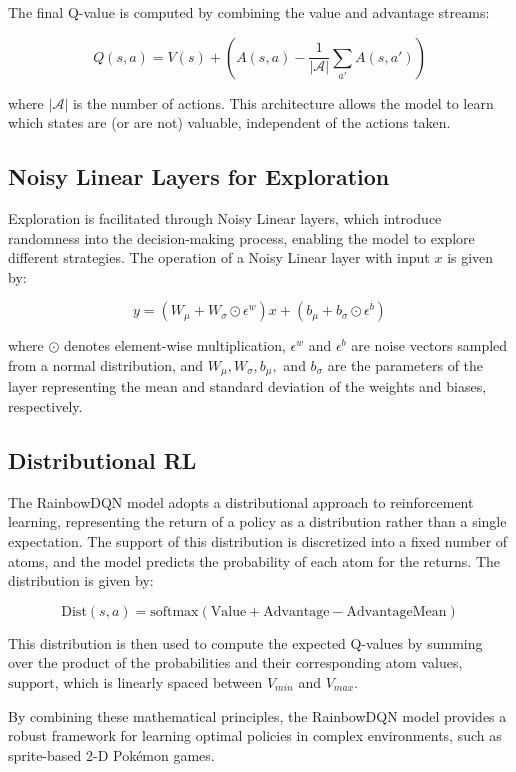 \documentclass[12pt,a4paper]{article}
\begin{document}
The final Q-value is computed by combining the value and advantage streams:

\[
Q(s, a) = V(s) + (A(s, a) - \frac{1}{|\mathcal{A}|} \sum_{a'} A(s, a'))
\]

where $|\mathcal{A}|$ is the number of actions. This architecture allows the model to learn which states are (or are not) valuable, independent of the actions taken.

\subsection{Noisy Linear Layers for Exploration}

Exploration is facilitated through Noisy Linear layers, which introduce randomness into the decision-making process, enabling the model to explore different strategies. The operation of a Noisy Linear layer with input $x$ is given by:

\[
y = (W_{\mu} + W_{\sigma} \odot \epsilon^w) x + (b_{\mu} + b_{\sigma} \odot \epsilon^b)
\]

where $\odot$ denotes element-wise multiplication, $\epsilon^w$ and $\epsilon^b$ are noise vectors sampled from a normal distribution, and $W_{\mu}, W_{\sigma}, b_{\mu},$ and $b_{\sigma}$ are the parameters of the layer representing the mean and standard deviation of the weights and biases, respectively.

\subsection{Distributional RL}

The RainbowDQN model adopts a distributional approach to reinforcement learning, representing the return of a policy as a distribution rather than a single expectation. The support of this distribution is discretized into a fixed number of atoms, and the model predicts the probability of each atom for the returns. The distribution is given by:

\[
\text{Dist}(s, a) = \text{softmax}(\text{Value} + \text{Advantage} - \text{AdvantageMean})
\]

This distribution is then used to compute the expected Q-values by summing over the product of the probabilities and their corresponding atom values, $\text{support}$, which is linearly spaced between $V_{min}$ and $V_{max}$.

By combining these mathematical principles, the RainbowDQN model provides a robust framework for learning optimal policies in complex environments, such as sprite-based 2-D Pokémon games.
\end{document}
